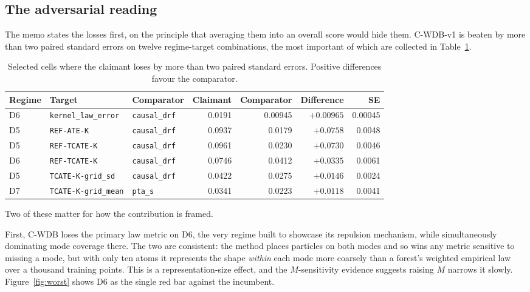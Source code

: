 \documentclass[11pt,a4paper]{article}
\theoremstyle{definition}
\theoremstyle{remark}
\newcommand{\CWDB}{\textsf{C-WDB}}
\begin{document}
\subsection{The adversarial reading}

The memo states the losses first, on the principle that averaging them into an
overall score would hide them. C-WDB-v1 is beaten by more than two paired
standard errors on twelve regime-target combinations, the most important of which
are collected in Table~\ref{tab:adverse}.

\begin{table}[htbp]
\centering
\caption{Selected cells where the claimant loses by more than two paired standard
errors. Positive differences favour the comparator.}
\label{tab:adverse}
\small
\begin{tabular}{@{}lllrrrr@{}}
\toprule
Regime & Target & Comparator & Claimant & Comparator & Difference & SE \\
\midrule
D6 & \texttt{kernel\_law\_error} & \texttt{causal\_drf} & 0.0191 & 0.00945 & $+0.00965$ & 0.00045 \\
D5 & \texttt{REF-ATE-K} & \texttt{causal\_drf} & 0.0937 & 0.0179 & $+0.0758$ & 0.0048 \\
D5 & \texttt{REF-TCATE-K} & \texttt{causal\_drf} & 0.0961 & 0.0230 & $+0.0730$ & 0.0046 \\
D6 & \texttt{REF-TCATE-K} & \texttt{causal\_drf} & 0.0746 & 0.0412 & $+0.0335$ & 0.0061 \\
D5 & \texttt{TCATE-K-grid\_sd} & \texttt{causal\_drf} & 0.0422 & 0.0275 & $+0.0146$ & 0.0024 \\
D7 & \texttt{TCATE-K-grid\_mean} & \texttt{pta\_s} & 0.0341 & 0.0223 & $+0.0118$ & 0.0041 \\
\bottomrule
\end{tabular}
\end{table}

Two of these matter for how the contribution is framed.

First, \CWDB{} loses the primary law metric on D6, the very regime built to
showcase its repulsion mechanism, while simultaneously dominating mode coverage
there. The two are consistent: the method places particles on both modes and so
wins any metric sensitive to missing a mode, but with only ten atoms it
represents the shape \emph{within} each mode more coarsely than a forest's
weighted empirical law over a thousand training points. This is a
representation-size effect, and the $M$-sensitivity evidence suggests raising $M$
narrows it slowly. Figure~\ref{fig:worst} shows D6 as the single red bar against
the incumbent.
\end{document}
